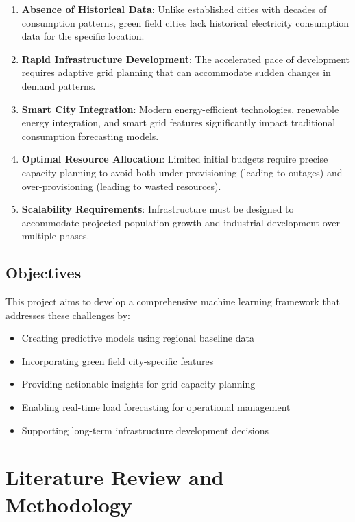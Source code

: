 \documentclass[12pt,a4paper]{article}
\begin{document}
\begin{enumerate}[itemsep=0.5em]
    \item \textbf{Absence of Historical Data}: Unlike established cities with decades of consumption patterns, green field cities lack historical electricity consumption data for the specific location.
    
    \item \textbf{Rapid Infrastructure Development}: The accelerated pace of development requires adaptive grid planning that can accommodate sudden changes in demand patterns.
    
    \item \textbf{Smart City Integration}: Modern energy-efficient technologies, renewable energy integration, and smart grid features significantly impact traditional consumption forecasting models.
    
    \item \textbf{Optimal Resource Allocation}: Limited initial budgets require precise capacity planning to avoid both under-provisioning (leading to outages) and over-provisioning (leading to wasted resources).
    
    \item \textbf{Scalability Requirements}: Infrastructure must be designed to accommodate projected population growth and industrial development over multiple phases.
\end{enumerate}

\subsection{Objectives}
This project aims to develop a comprehensive machine learning framework that addresses these challenges by:

\begin{itemize}
    \item Creating predictive models using regional baseline data
    \item Incorporating green field city-specific features
    \item Providing actionable insights for grid capacity planning
    \item Enabling real-time load forecasting for operational management
    \item Supporting long-term infrastructure development decisions
\end{itemize}

\section{Literature Review and Methodology}
\end{document}
